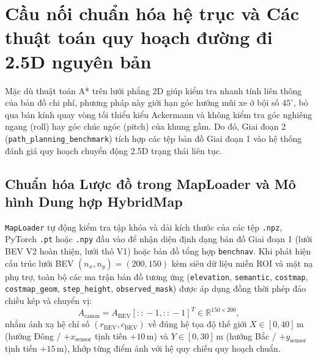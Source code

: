 \documentclass[a4paper,fleqn]{cas-sc}
\begin{document}
\section{Cầu nối chuẩn hóa hệ trục và Các thuật toán quy hoạch đường đi 2.5D nguyên bản}
\label{sec:phase2_theory}

Mặc dù thuật toán A* trên lưới phẳng 2D giúp kiểm tra nhanh tính liên thông của bản đồ chi phí, phương pháp này giới hạn góc hướng mũi xe ở bội số $45^\circ$, bỏ qua bán kính quay vòng tối thiểu kiểu Ackermann và không kiểm tra góc nghiêng ngang (roll) hay góc chúc ngóc (pitch) của khung gầm. Do đó, Giai đoạn 2 (\texttt{path\_planning\_benchmark}) tích hợp các tệp bản đồ Giai đoạn 1 vào hệ thống đánh giá quy hoạch chuyển động 2.5D trạng thái liên tục.

\subsection{Chuẩn hóa Lược đồ trong MapLoader và Mô hình Dung hợp HybridMap}
\label{subsec:bridge_hybridmap}
\texttt{MapLoader} tự động kiểm tra tập khóa và dải kích thước của các tệp \texttt{.npz}, PyTorch \texttt{.pt} hoặc \texttt{.npy} đầu vào để nhận diện định dạng bản đồ Giai đoạn 1 (lưới BEV V2 hoàn thiện, lưới thô V1) hoặc bản đồ tổng hợp \texttt{benchnav}. Khi phát hiện cấu trúc lưới BEV $(n_x, n_y) = (200, 150)$ kèm siêu dữ liệu miền ROI và mặt nạ phụ trợ, toàn bộ các ma trận bản đồ tương ứng (\texttt{elevation}, \texttt{semantic}, \texttt{costmap}, \texttt{costmap\_geom}, \texttt{step\_height}, \texttt{observed\_mask}) được áp dụng đồng thời phép đảo chiều kép và chuyển vị:
\begin{equation}
    A_{\text{canon}} = A_{\text{BEV}}[::\!-1, ::\!-1]^T \in \mathbb{R}^{150 \times 200},
\end{equation}
nhằm ánh xạ hệ chỉ số $(r_{\text{BEV}}, c_{\text{BEV}})$ về đúng hệ tọa độ thế giới $X \in [0, 40]\,\text{m}$ (hướng Đông / $+x_{\text{sensor}}$ tịnh tiến $+10\,\text{m}$) và $Y \in [0, 30]\,\text{m}$ (hướng Bắc / $+y_{\text{sensor}}$ tịnh tiến $+15\,\text{m}$), khớp từng điểm ảnh với hệ quy chiếu quy hoạch chuẩn.
\end{document}
